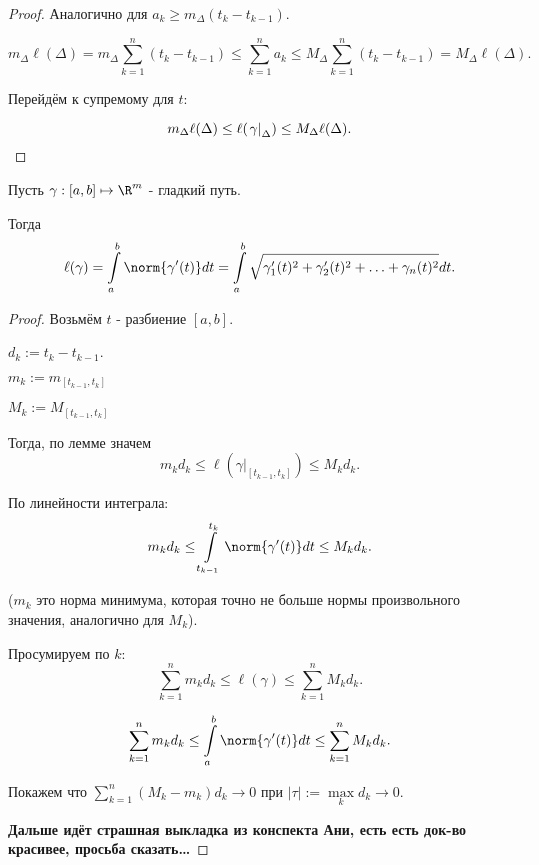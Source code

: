 \begin{lemma}
\begin{proof}
            Аналогично для $a_{k} \ge m_{\Delta}(t_{k}-t_{k-1})$.

            \[ m_{\Delta} \ell(\Delta) = m_{\Delta} \sum\limits_{k=1}^{n} (t_{k}-t_{k-1}) \le \sum\limits_{k=1}^{n} a_{k} \le M_{\Delta} \sum\limits_{k=1}^{n} (t_{k}-t_{k-1}) = M_{\Delta} \ell(\Delta) .\]

            Перейдём к супремому для $t$:

            \[ m_{\Delta} \ell(\Delta) \le \ell(\left.\gamma\right|_{\Delta}) \le M_{\Delta} \ell(\Delta) . \qedhere\] 
        \end{proof}
\end{lemma}

\begin{theorem} \thmslashn

    Пусть $\gamma : [a, b] \mapsto \R^{m}$ - гладкий путь.

    Тогда
    \[ \ell(\gamma) = \int\limits_{a}^{b} \norm{\gamma'(t)}dt = \int\limits_{a}^{b} \sqrt{\gamma_1'(t)^2 + \gamma_2'(t)^2 + \ldots + \gamma_{n}(t)^2}dt    .\]
    \begin{proof} \thmslashn
    
        Возьмём $t$ - разбиение $[a, b]$.
        
        $d_{k} := t_{k} - t_{k-1}$.

        $m_{k} := m_{[t_{k-1}, t_{k}]}$

        $M_{k} := M_{[t_{k-1}, t_{k}]}$

        Тогда, по лемме значем
        \[ m_{k}d_{k} \le \ell\left( \left. \gamma\right|_{[t_{k-1}, t_{k}]} \right) \le M_{k}d_{k}  .\]

        По линейности интеграла:
        \[ m_{k}d_{k} \le \int\limits_{t_{k-1}}^{t_{k}} \norm{\gamma'(t)}dt  \le M_{k}d_{k}  .\]

        ($m_{k}$ это норма минимума, которая точно не больше нормы произвольного значения, аналогично для $M_{k}$).

        Просумируем по $k$:
        \[ \sum\limits_{k=1}^{n} m_{k}d_{k} \le \ell\left(\gamma\right) \le \sum\limits_{k=1}^{n} M_{k}d_{k}  .\]
        
        \[ \sum\limits_{k=1}^{n} m_{k}d_{k} \le \int\limits_{a}^{b} \norm{\gamma'(t)}dt  \le \sum\limits_{k=1}^{n} M_{k}d_{k}  .\]

        Покажем что $\sum\limits_{k=1}^{n} (M_{k} - m_{k})d_{k} \to 0$ при $|\tau| := \max\limits_{k} d_{k} \to 0$.

        \textbf{Дальше идёт страшная выкладка из конспекта Ани, есть есть док-во красивее, просьба сказать\ldots}



\end{proof}
\end{theorem}
